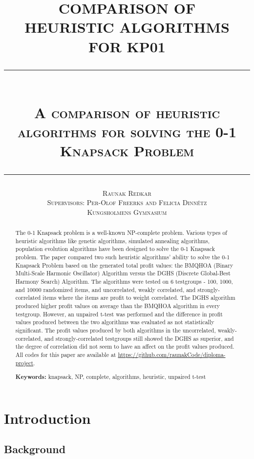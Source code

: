 \documentclass[titlepage]{article}
\title{
    \textbf{COMPARISON OF \\
    HEURISTIC ALGORITHMS \\
    FOR KP01} \\[0.5cm]
    \rule{12cm}{0.3mm} \\[0.5cm] 
    \small \scshape{A comparison of heuristic algorithms for solving the 0-1 Knapsack Problem} \\[0.4cm]
    \rule{12cm}{0.3mm}
    \vskip -0.3cm
}
\author{
    \small \scshape{Raunak Redkar} \\ 
    \small \scshape{Supervisors: Per-Olof Freerks and Felicia Dinnétz} \\
    \scriptsize \scshape{Kungsholmens Gymnasium}
}
\begin{document}
\renewcommand{\arraystretch}{1.5}

\onehalfspacing

\maketitle

\newpage

\begin{abstract}
    The 0-1 Knapsack problem is a well-known NP-complete problem. Various types of heuristic algorithms like genetic algorithms, simulated annealing algorithms, population evolution algorithms have been designed to solve the 0-1 Knapsack problem. The paper compared two such heuristic algorithms' ability to solve the 0-1 Knapsack Problem based on the generated total profit values: the BMQHOA (Binary Multi-Scale Harmonic Oscillator) Algorithm versus the DGHS (Discrete Global-Best Harmony Search) Algorithm. The algorithms were tested on 6 testgroups - 100, 1000, and 10000 randomized items, and uncorrelated, weakly correlated, and strongly-correlated items where the items are profit to weight correlated. The DGHS algorithm produced higher profit values on average than the BMQHOA algorithm in every testgroup. However, an unpaired t-test was performed and the difference in profit values produced between the two algorithms was evaluated as not statistically significant. The profit values produced by both algorithms in the uncorrelated, weakly-correlated, and strongly-correlated testgroups still showed the DGHS as superior, and the degree of correlation did not seem to have an affect on the profit values produced.  All codes for this paper are available at \href{github.com/raunakCode}{https://github.com/raunakCode/diploma-project}.

    \textbf{Keywords:} knapsack, NP, complete, algorithms, heuristic, unpaired t-test
\end{abstract}

\newpage


\tableofcontents
\listofalgorithms
\newpage

\section{Introduction}

\subsection{Background}
\end{document}
